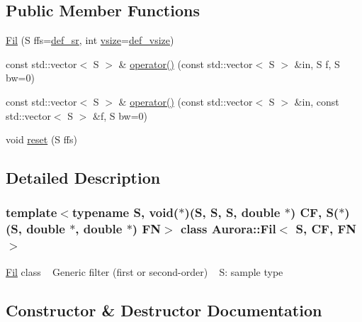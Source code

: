 \subsection*{Public Member Functions}
\begin{DoxyCompactItemize}
\item 
\hyperlink{class_aurora_1_1_fil_af431fc69db63c5255ca4c39c2a2a96b8}{Fil} (S ffs=\hyperlink{namespace_aurora_ad49263d809bea98dd422e95bc91bc03e}{def\+\_\+sr}, int \hyperlink{class_aurora_1_1_snd_base_af9e21aaf411b17f7a8221c991ce5d291}{vsize}=\hyperlink{namespace_aurora_afaaddf667a06e7ce23c667a8b7295263}{def\+\_\+vsize})
\item 
const std\+::vector$<$ S $>$ \& \hyperlink{class_aurora_1_1_fil_a62f4f94aaf2eccf547cc78904dd0c118}{operator()} (const std\+::vector$<$ S $>$ \&in, S f, S bw=0)
\item 
const std\+::vector$<$ S $>$ \& \hyperlink{class_aurora_1_1_fil_af5803c67f4b30e46045aa51dfbe13ea9}{operator()} (const std\+::vector$<$ S $>$ \&in, const std\+::vector$<$ S $>$ \&f, S bw=0)
\item 
void \hyperlink{class_aurora_1_1_fil_aff34ac5681c55706eabb15cdbc03379c}{reset} (S ffs)
\end{DoxyCompactItemize}


\subsection{Detailed Description}
\subsubsection*{template$<$typename S, void($\ast$)(\+S, S, S, double $\ast$) CF, S($\ast$)(\+S, double $\ast$, double $\ast$) FN$>$\newline
class Aurora\+::\+Fil$<$ S, C\+F, F\+N $>$}

\hyperlink{class_aurora_1_1_fil}{Fil} class ~\newline
Generic filter (first or second-\/order) ~\newline
S\+: sample type 

\subsection{Constructor \& Destructor Documentation}
\mbox{\label{class_aurora_1_1_fil_af431fc69db63c5255ca4c39c2a2a96b8}} 
